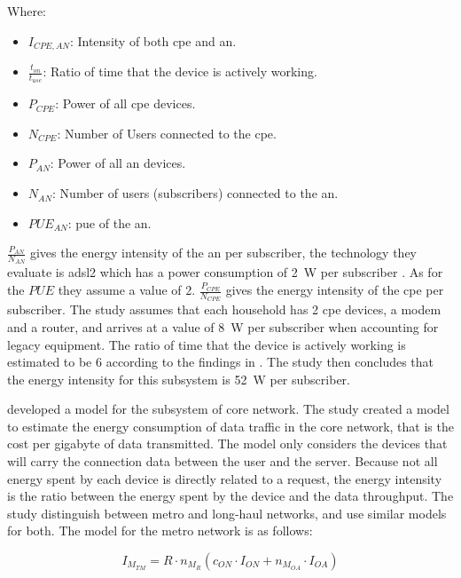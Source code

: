 Where: 

\begin{itemize}
    \item $I_{CPE,AN}$: Intensity of both \ac{cpe} and \ac{an}.
    \item $\frac{t_{on}}{t_{use}}$: Ratio of time that the device is actively working. 
    \item $P_{CPE}$: Power of all \ac{cpe} devices.
    \item $N_{CPE}$: Number of Users connected to the \ac{cpe}.
    \item $P_{AN}$: Power of all \ac{an} devices.
    \item $N_{AN}$: Number of users (subscribers) connected to the \ac{an}.
    \item $PUE_{AN}$: \ac{pue} of the \ac{an}.
\end{itemize}

$\frac{P_{AN}}{N_{AN}}$ gives the energy intensity of the \ac{an} per subscriber, the technology they evaluate is \ac{adsl2} which has a power consumption of \SI{2}{\watt} per subscriber \citet{Schien2013}. As for the $PUE$ they assume a value of 2. 
$\frac{P_{CPE}}{N_{CPE}}$ gives the energy intensity of the \ac{cpe} per subscriber. The study assumes that each household has 2 \ac{cpe} devices, a modem and a router, and arrives at a value of \SI{8}{\watt} per subscriber when accounting for legacy equipment. 
The ratio of time that the device is actively working is estimated to be 6 according to the findings in \citet{Nissen2007}.
The study then concludes that the energy intensity for this subsystem is \SI{52}{\watt} per subscriber.

\citet{Schien2015} developed a model for the subsystem of core network. The study created a model to estimate the energy consumption of data traffic in the core network, that is the cost per \ac{gigabyte} of data transmitted. 
The model only considers the devices that will carry the connection data between the user and the server. Because not all energy spent by each device is directly related to a request, the energy intensity is the ratio between the energy spent by the device and the data throughput. The study distinguish between metro and long-haul networks, and use similar models for both. The model for the metro network is as follows:

\begin{equation}
\label{formula:schien_core_metro}
    I_{M_{TM}} = R \cdot n_{M_R} (c_{ON} \cdot I_{ON} + n_{M_{OA}} \cdot I_{OA})
\end{equation}


